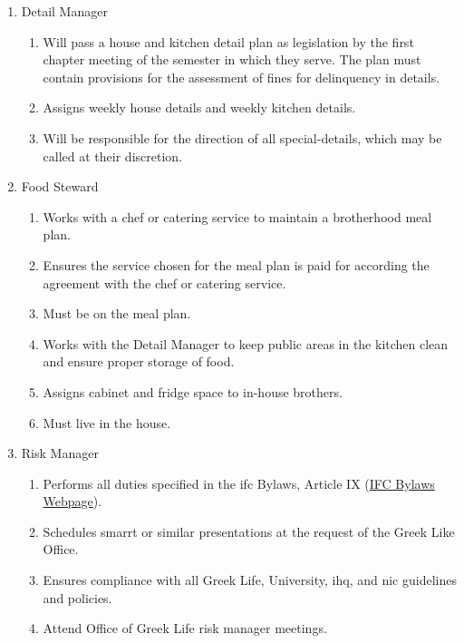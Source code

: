 \begin{enumerate}
		\item Detail Manager
			\begin{enumerate}
				\item Will pass a house and kitchen detail plan as legislation by the first chapter meeting of the semester in which they serve. The plan must contain provisions for the assessment of fines for delinquency in details.
				\item Assigns weekly house details and weekly kitchen details.
				\item Will be responsible for the direction of all \glspl{special-detail}, which may be called at their discretion.
			\end{enumerate}

		\item Food Steward
			\begin{enumerate}
				\item Works with a chef or catering service to maintain a brotherhood meal plan.
				\item Ensures the service chosen for the meal plan is paid for according the agreement with the chef or catering service.
				\item Must be on the meal plan.
				\item Works with the Detail Manager to keep public areas in the kitchen clean and ensure proper storage of food.
				\item Assigns cabinet and fridge space to in-house brothers.
				\item Must live in the house.
			\end{enumerate}

		\item Risk Manager
			\begin{enumerate}
				\item Performs all duties specified in the \gls{ifc} Bylaws, Article IX (\href{https://community.case.edu/greeklife/interfraternal-bylaws/}{IFC Bylaws Webpage}).
				\item Schedules \gls{smarrt} or similar presentations at the request of the Greek Like Office.
				\item Ensures compliance with all Greek Life, University, \gls{ihq}, and \gls{nic} guidelines and policies.
				\item Attend Office of Greek Life risk manager meetings.
			\end{enumerate}


\end{enumerate}
